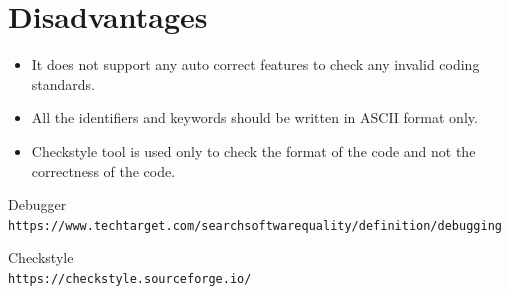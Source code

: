 \documentclass[12pt,letterpaper]{report}
\begin{document}
\section{Disadvantages}
\begin{itemize}
    \item It does not support any auto correct features to check any invalid coding standards.
    \item All the identifiers and keywords should be written in ASCII format only.
    \item Checkstyle tool is used only to check the format of the code and not the correctness of the code.
\end{itemize}









\begin{thebibliography}{9}
Debugger
\\\texttt{https://www.techtarget.com/searchsoftwarequality/definition/debugging}

Checkstyle
\\\texttt{https://checkstyle.sourceforge.io/}



\end{thebibliography}
\end{document}
